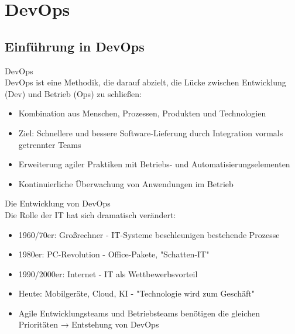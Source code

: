 \section{DevOps}

\subsection{Einführung in DevOps}

\begin{definition}{DevOps}\\
    DevOps ist eine Methodik, die darauf abzielt, die Lücke zwischen Entwicklung (Dev) und Betrieb (Ops) zu schließen:
    \begin{itemize}
        \item Kombination aus Menschen, Prozessen, Produkten und Technologien
        \item Ziel: Schnellere und bessere Software-Lieferung durch Integration vormals getrennter Teams
        \item Erweiterung agiler Praktiken mit Betriebs- und Automatisierungselementen
        \item Kontinuierliche Überwachung von Anwendungen im Betrieb
    \end{itemize}
\end{definition}

\begin{concept}{Die Entwicklung von DevOps}\\
    Die Rolle der IT hat sich dramatisch verändert:
    \begin{itemize}
        \item 1960/70er: Großrechner - IT-Systeme beschleunigen bestehende Prozesse
        \item 1980er: PC-Revolution - Office-Pakete, "Schatten-IT"
        \item 1990/2000er: Internet - IT als Wettbewerbsvorteil
        \item Heute: Mobilgeräte, Cloud, KI - "Technologie wird zum Geschäft"
        \item Agile Entwicklungsteams und Betriebsteams benötigen die gleichen Prioritäten → Entstehung von DevOps
    \end{itemize}
\end{concept}

